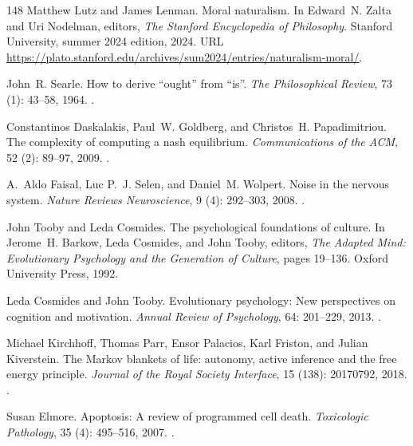 \documentclass[11pt]{article}
\theoremstyle{plain}
\theoremstyle{definition}
\theoremstyle{remark}
\begin{document}
\begin{thebibliography}{148}
Matthew Lutz and James Lenman.
\newblock Moral naturalism.
\newblock In Edward~N. Zalta and Uri Nodelman, editors, \emph{The {Stanford}
  Encyclopedia of Philosophy}. Stanford University, summer 2024 edition, 2024.
\newblock URL
  \url{https://plato.stanford.edu/archives/sum2024/entries/naturalism-moral/}.

John~R. Searle.
\newblock How to derive ``ought'' from ``is''.
\newblock \emph{The Philosophical Review}, 73 (1): 43--58,
  1964.
\newblock {}.

Constantinos Daskalakis, Paul~W. Goldberg, and Christos~H. Papadimitriou.
\newblock The complexity of computing a nash equilibrium.
\newblock \emph{Communications of the ACM}, 52 (2): 89--97,
  2009.
\newblock {}.

A.~Aldo Faisal, Luc P.~J. Selen, and Daniel~M. Wolpert.
\newblock Noise in the nervous system.
\newblock \emph{Nature Reviews Neuroscience}, 9 (4):
  292--303, 2008.
\newblock {}.

John Tooby and Leda Cosmides.
\newblock The psychological foundations of culture.
\newblock In Jerome~H. Barkow, Leda Cosmides, and John Tooby, editors,
  \emph{The Adapted Mind: Evolutionary Psychology and the Generation of
  Culture}, pages 19--136. Oxford University Press, 1992.

Leda Cosmides and John Tooby.
\newblock Evolutionary psychology: New perspectives on cognition and
  motivation.
\newblock \emph{Annual Review of Psychology}, 64: 201--229, 2013.
\newblock {}.

Michael Kirchhoff, Thomas Parr, Ensor Palacios, Karl Friston, and Julian
  Kiverstein.
\newblock The {Markov} blankets of life: autonomy, active inference and the
  free energy principle.
\newblock \emph{Journal of the Royal Society Interface}, 15
  (138): 20170792, 2018.
\newblock {}.

Susan Elmore.
\newblock Apoptosis: A review of programmed cell death.
\newblock \emph{Toxicologic Pathology}, 35 (4): 495--516,
  2007.
\newblock {}.


\end{thebibliography}
\end{document}

